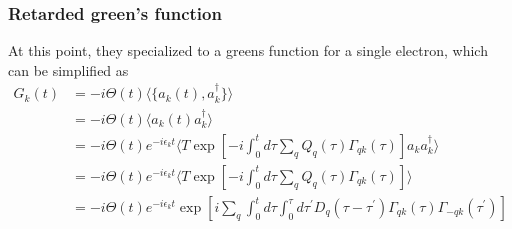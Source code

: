 \subsubsection{Retarded green's function}
At this point, they specialized to a greens function for a single electron, which can be simplified as
\begin{align}
    G_k(t)&= -i \Theta(t) \langle \{a_k(t), a_k^\dagger\} \rangle \\
&= -i \Theta(t) \langle a_k(t) a_k^\dagger \rangle \\
&= -i \Theta(t) e^{-i \epsilon_k t} \langle T \exp \left[-i \int_0^t d \tau \sum_q Q_q(\tau) \Gamma_{q k}(\tau)\right] a_k a_k^\dagger \rangle \\
&= -i \Theta(t) e^{-i \epsilon_k t} \langle T \exp \left[-i \int_0^t d \tau \sum_q Q_q(\tau) \Gamma_{q k}(\tau)\right] \rangle \\
&= -i \Theta(t) e^{-i \epsilon_k t} \exp \left[i \sum_q \int_0^t d \tau \int_0^\tau d \tau^{\prime} D_q(\tau-\tau^{\prime}) \Gamma_{q k}(\tau) \Gamma_{-q k}\left(\tau^{\prime}\right)\right]
\end{align}





